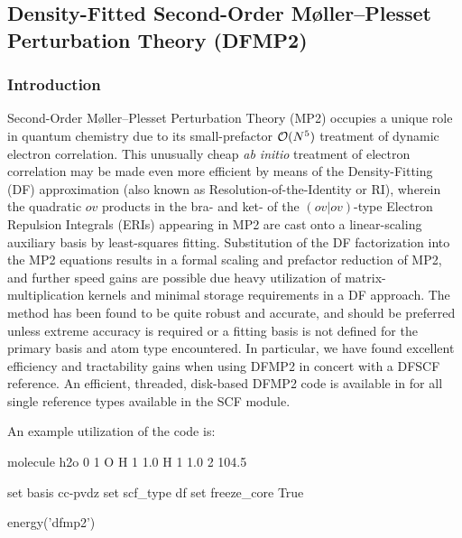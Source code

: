 \subsection{Density-Fitted Second-Order M\o{}ller--Plesset Perturbation Theory (DFMP2)} \label{dfmp2}

\subsubsection{Introduction}

Second-Order M\o{}ller--Plesset Perturbation Theory (MP2) occupies a unique role
in quantum chemistry due to its small-prefactor ${\cal O}(N^5)$ treatment of
dynamic electron correlation. This unusually cheap
\textit{ab initio} treatment of electron correlation may be made even more
efficient by means of the Density-Fitting (DF) approximation (also known as
Resolution-of-the-Identity or RI), wherein the quadratic $ov$ products in the
bra- and ket- of the $(ov|ov)$-type Electron Repulsion Integrals (ERIs)
appearing in MP2 are cast onto a linear-scaling auxiliary basis by least-squares
fitting.  Substitution of the DF factorization into the MP2 equations results in
a formal scaling and prefactor reduction of MP2, and further speed gains are
possible due heavy utilization of matrix-multiplication kernels and minimal
storage requirements in a DF approach. The method has been found to be quite
robust and accurate, and should be preferred unless extreme accuracy is required
or a fitting basis is not defined for the primary basis and atom type
encountered. In particular, we have found excellent efficiency and tractability
gains when using DFMP2 in concert with a DFSCF reference.  An efficient,
threaded, disk-based DFMP2 code is available in \PSIfour for all single
reference types available in the SCF module.  

An example utilization of the code is:
\begin{Snippet}
molecule h2o {
0 1
O
H 1 1.0
H 1 1.0 2 104.5
}

set basis cc-pvdz
set scf_type df
set freeze_core True

energy('dfmp2')
\end{Snippet}

